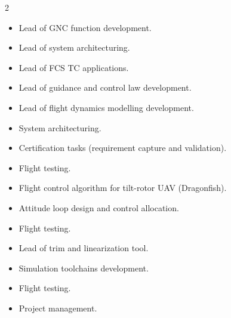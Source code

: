\documentclass[10pt,a4paper,ragged2e,withhyper]{altacv}
\begin{document}
\begin{paracol}{2}
            \begin{itemize}
                \item Lead of GNC function development.
                \item Lead of system architecturing.
                \item Lead of FCS TC applications.
            \end{itemize}
            \bigskip
            
            \begin{itemize}
                \item Lead of guidance and control law development.
                \item Lead of flight dynamics modelling development.
                \item System architecturing.
                \item Certification tasks (requirement capture and validation).
                \item Flight testing.
            \end{itemize}
            \bigskip
            
            \begin{itemize}
                \item Flight control algorithm for tilt-rotor UAV (Dragonfish).
                \item Attitude loop design and control allocation.
                \item Flight testing.
            \end{itemize}
            \bigskip

            \begin{itemize}
                \item Lead of trim and linearization tool.
                \item Simulation toolchains development.
                \item Flight testing.
                \item Project management.
            \end{itemize}
    

\end{paracol}
\end{document}
